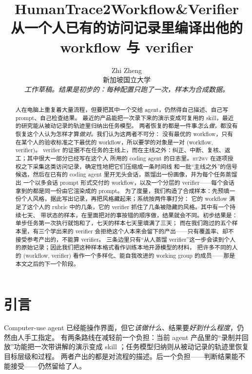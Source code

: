 \documentclass[10pt,UTF8,scheme=plain]{ctexart}
\title{\textbf{HumanTrace2Workflow\&Verifier}\\[2pt]
\large 从一个人已有的访问记录里编译出他的 workflow 与 verifier}
\author{Zhi Zheng\\ \small 新加坡国立大学 \\ \small\emph{工作草稿。结果是初步的：每种配置只跑了一次，样本为合成数据。}}
\date{}
\newcommand{\sys}{\textsc{ht2wv}}
\begin{document}
\maketitle

\begin{abstract}
人在电脑上重复着大量流程，但要把其中一个交给 agent，仍然得自己描述、自己写 prompt、自己检查结果。
最近的产品能把一次录下来的演示变成可复用的 skill，最近的研究能从被动记录的轨迹里归纳出任务模型。
两者恢复的都是一件事\emph{怎么做}，都没有恢复这个人认为怎样才算\emph{做对}。我们认为这两者不可分：
没有最优的 workflow，只有在某个人的验收标准之下最优的 workflow，所以要学的对象是一对 (workflow, verifier)。
verifier 的证据不在任务的主线上，而在主线之外：纠正、中断、复核、返工；其中很大一部分已经写在这个人
所用的 coding agent 的日志里。\sys{} 在逐项授权之下采集这类访问记录，确定性地把它们压缩成一条时间线
和一批“主线之外”的信号候选，然后在已有的 coding agent 里开无头会话，蒸馏出一份画像，并为每个任务蒸馏出
一个以多会话 prompt 形式交付的 workflow，以及一个分层的 verifier——每个会话拿到的都是同一份由它渲染成的 prompt。
为了度量，我们构造了合成样本：先预填一份个人风格，据此写出记录，再把风格藏起来；系统按两件事打分：
它的 workflow 满足了这个人的 rubric 中的几条，它的 verifier 抓住了几条被隐藏的风格。其中有一个持续七天、
带状态的样本，在里面把对的事按错的顺序做，结果就会不同。初步结果是：单步任务第一次执行就饱和了，七天的样本七天里填满了三天；
而在我们跑过的五个样本里，有三个学出来的 verifier 会拒绝这个人本来会留下的产出——只有覆盖率、却不接受参考产出的，不能算 verifier。
三条边里只有“从人蒸馏 verifier”这一步会读到个人的原始记录；因此我们把这种样本格式看作训练本地开源模型的材料，
把许多不同的人的 (workflow, verifier) 看作一个多样化、能自我改进的 working group 的成员——那是本文之后的下一个阶段。
\end{abstract}

\section{引言}

Computer-use agent 已经能操作界面，但它\emph{该做什么}、结果要\emph{好到什么程度}，仍然由人手工指定。
有两条路线在减轻前一个负担：当前 agent 产品里的“录制并回放”功能把一次带讲解的演示变成 skill
\cite{recordskill,recordreplay,skillrecorder}；任务模型归纳则从被动记录的轨迹里恢复目标层级和过程\cite{tmi}。
两者产出的都是对流程的描述。后一个负担——判断结果能不能接受——仍然留给了人。
\end{document}
